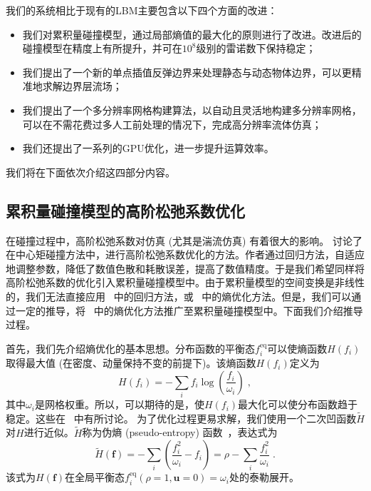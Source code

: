 我们的系统相比于现有的LBM主要包含以下四个方面的改进：
\begin{itemize}
	\item 我们对累积量碰撞模型，通过局部熵值的最大化的原则进行了改进。改进后的碰撞模型在精度上有所提升，并可在$10^8$级别的雷诺数下保持稳定； 
	\item 我们提出了一个新的单点插值反弹边界来处理静态与动态物体边界，可以更精准地求解边界层流场；
	\item 我们提出了一个多分辨率网格构建算法，以自动且灵活地构建多分辨率网格，可以在不需花费过多人工前处理的情况下，完成高分辨率流体仿真；
	\item 我们还提出了一系列的GPU优化，进一步提升运算效率。
\end{itemize}

我们将在下面依次介绍这四部分内容。

\subsection{累积量碰撞模型的高阶松弛系数优化}
在碰撞过程中，高阶松弛系数对仿真 (尤其是湍流仿真) 有着很大的影响。\citet{Li-2020} 讨论了在中心矩碰撞方法中，进行高阶松弛系数优化的方法。作者通过回归方法，自适应地调整参数，降低了数值色散和耗散误差，提高了数值精度。于是我们希望同样将高阶松弛系数的优化引入累积量碰撞模型中。由于累积量模型的空间变换是非线性的，我们无法直接应用~\citep{Li-2020} 中的回归方法，或~\citep{Kramer-2019} 中的熵优化方法。但是，我们可以通过一定的推导，将~\citep{Kramer-2019} 中的熵优化方法推广至累积量碰撞模型中。下面我们介绍推导过程。

首先，我们先介绍熵优化的基本思想。分布函数的平衡态$f^\text{eq}_i$可以使熵函数$H(f_i)$取得最大值 (在密度、动量保持不变的前提下)。该熵函数$H(f_i)$定义为
\begin{equation}
\label{eq:entropy_func}
H(f_i)=-\sum_i f_i \log \left(\frac{f_i}{\omega_i}\right) \;,
\end{equation}
其中$\omega_i$是网格权重。所以，可以期待的是，使$H(f_i)$最大化可以使分布函数趋于稳定。这些在~\citep{Kramer-2019} 中有所讨论。
为了优化过程更易求解，我们使用一个二次凹函数$\tilde{H}$对$H$进行近似。$\tilde{H}$称为伪熵 (pseudo-entropy) 函数~\citep{Kramer-2019}，表达式为
\begin{equation}
\label{eq:pseudoentropy_func}
\tilde{H}(\bm{f})=-\sum_{i}\left(\frac{f_i^2}{\omega_i}-f_i\right)=\rho-\sum_{i} \frac{f_i^2}{\omega_i}\;.
\end{equation}
该式为$H(\bm{f})$在全局平衡态$f_i^{\mathrm{eq}}(\rho=1, \mathbf{u}=0)=\omega_i$处的泰勒展开。

